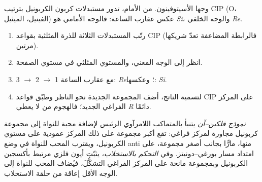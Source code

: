 \begin{omfigure}

{\small وجها الأسيتوفينون. من الأمام، تدور مستبدلات
كربون الكربونيل بترتيب CIP (O، الفينيل، الميثيل) عكس عقارب الساعة: فالوجه الأمامي
هو \textit{Si}، والوجه الخلفي \textit{Re}.}
\end{omfigure}

\begin{method}\label{met:b3:asymmetric-synthesis:re-si}
\begin{enumerate}
  \item رتّب المستبدلات الثلاثة للذرة المثلثية بقواعد CIP (فالرابطة
        المضاعفة تعدّ شريكها مرتين).
  \item انظر إلى الوجه المعني، والمستوي المثلثي في مستوي الصفحة.
  \item مع عقارب الساعة 1 $\to$ 2 $\to$ 3: \textit{Re}؛ وعكسها: \textit{Si}.
  \item لتسمية الناتج، أضف المجموعة الجديدة نحو الناظر وطبّق
        قواعد CIP على المركز الفراغي الجديد؛ فالهجوم من  لا يعطي \textit{R} دائمًا.
\end{enumerate}
\end{method}

\begin{definition}\label{def:b3:asymmetric-synthesis:felkin}
\emph{نموذج فلكين--آن} يتنبأ بالمتماكب اللامرآوي
الرئيس لإضافة محبة للنواة إلى مجموعة كربونيل مجاورة لمركز
فراغي: تقع أكبر مجموعة على ذلك المركز عمودية على مستوي
الكربونيل، ويقترب المحب للنواة في وضع anti منها، مارًّا بجانب أصغر
مجموعة، على امتداد مسار بورغي--دونيتز. وفي \emph{التحكم
بالاستخلاب}، يثبّت أيون فلزي مرتبط بأكسجين الكربونيل
وبمجموعة مانحة على المركز الفراغي التشكُّلَ، فيُضاف
المحب للنواة إلى الوجه الأقل إعاقة من حلقة الاستخلاب.
\end{definition}

